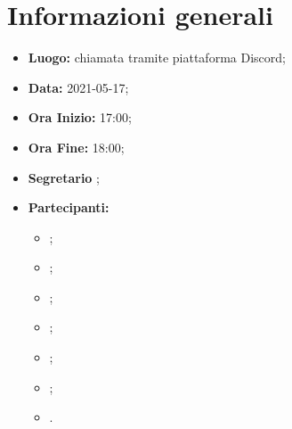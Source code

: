 \section{Informazioni generali}
	\begin{itemize}
		\item \textbf{Luogo:} chiamata tramite piattaforma Discord;
		\item \textbf{Data:} 2021-05-17;
		\item \textbf{Ora Inizio:} 17:00;
		\item \textbf{Ora Fine:} 18:00;
		\item \textbf{Segretario} \VAS;
		\item \textbf{Partecipanti:}
		\begin{itemize}
			\item \MB;
			\item \VAS;
			\item \FD;
			\item \NM;
			\item \SB;
			\item \GB;
			\item \MDI.
		\end{itemize}
		
	\end{itemize}